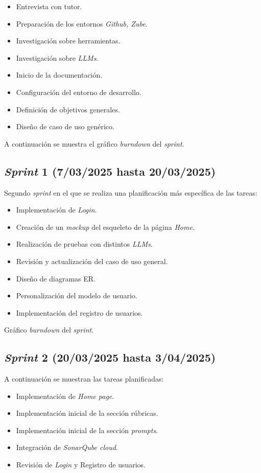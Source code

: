 \begin{itemize}
    \item Entrevista con tutor.
    \item Preparación de los entornos \textit{Github, Zube}.
    \item Investigación sobre herramientas.
    \item Investigación sobre \textit{LLMs}.
    \item Inicio de la documentación.
    \item Configuración del entorno de desarrollo.
    \item Definición de objetivos generales.
    \item Diseño de caso de uso genérico.
\end{itemize}

A continuación se muestra el gráfico \textit{burndown} del \textit{sprint}.

\subsection{\emph{Sprint} 1 (7/03/2025 hasta 20/03/2025)}
Segundo \textit{sprint} en el que se realiza una planificación más específica de las tareas:
\begin{itemize}
    \item Implementación de \textit{Login}.
    \item Creación de un \textit{mockup} del esqueleto de la página \textit{Home}.
    \item Realización de pruebas con distintos \textit{LLMs}.
    \item Revisión y actualización del caso de uso general.
    \item Diseño de diagramas ER.
    \item Personalización del modelo de usuario.
    \item Implementación del registro de usuarios.
\end{itemize}


Gráfico \textit{burndown} del \textit{sprint}.

\subsection{\emph{Sprint} 2 (20/03/2025 hasta 3/04/2025)}
A continuación se muestran las tareas planificadas:
\begin{itemize}
    \item Implementación de \textit{Home page}.
    \item Implementación inicial de la sección rúbricas.
    \item Implementación inicial de la sección \textit{prompts}.
    \item Integración de \textit{SonarQube cloud}.
    \item Revisión de \textit{Login} y Registro de usuarios.
\end{itemize}

